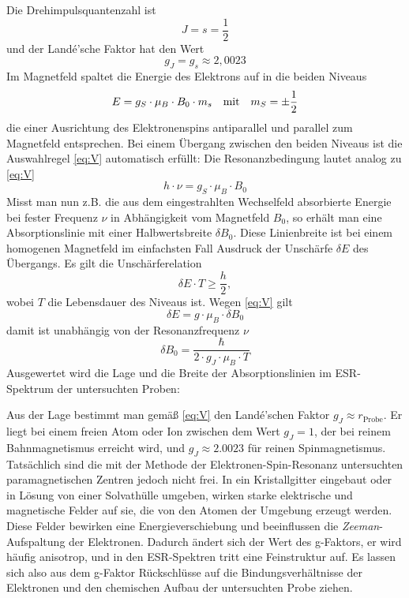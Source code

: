 \documentclass[ngerman]{scrartcl}
\begin{document}
Die Drehimpulsquantenzahl ist
\begin{equation*}
    J = s = \frac{1}{2}
\end{equation*}
und der Landé'sche Faktor hat den Wert
\begin{equation*}
    g_J = g_s \approx 2,0023
\end{equation*}
Im Magnetfeld spaltet die Energie des Elektrons auf in die beiden Niveaus
\begin{equation}
    E = g_S \cdot \mu_B \cdot B_0 \cdot m_s \qq{mit} m_S = \pm \frac{1}{2}
\end{equation}
die einer Ausrichtung des Elektronenspins antiparallel und parallel zum Magnetfeld entsprechen. Bei einem Übergang zwischen den beiden Niveaus ist die Auswahlregel \ref{eq:V} automatisch erfüllt: Die Resonanzbedingung lautet analog zu \ref{eq:V}
\begin{equation}
    h \cdot \nu = g_S \cdot \mu_B \cdot B_0
\end{equation}
Misst man nun z.B. die aus dem eingestrahlten Wechselfeld absorbierte Energie bei fester Frequenz $\nu$ in Abhängigkeit vom Magnetfeld $B_0$, so erhält man eine Absorptionslinie mit einer Halbwertsbreite $\delta B_0$. Diese Linienbreite ist bei einem homogenen Magnetfeld im einfachsten Fall Ausdruck der Unschärfe $\delta E$ des Übergangs. Es gilt die Unschärferelation
\begin{equation}
    \delta E \cdot T \geq \frac{h}{2},
\end{equation}
wobei $T$ die Lebensdauer des Niveaus ist. Wegen \autoref{eq:V} gilt
\begin{equation}
    \delta E = g \cdot \mu_B \cdot \delta B_0
\end{equation}
damit ist unabhängig von der Resonanzfrequenz $\nu$
\begin{equation}
    \delta B_0 = \frac{\hbar}{2 \cdot g_J \cdot \mu_B \cdot T}
\end{equation}
Ausgewertet wird die Lage und die Breite der Absorptionslinien im ESR-Spektrum der untersuchten Proben:

Aus der Lage bestimmt man gemäß \autoref{eq:V} den Landé'schen Faktor $g_J \approx r_{\text{Probe}}$. Er liegt bei einem freien Atom oder Ion zwischen dem Wert $g_J = 1$, der bei reinem Bahnmagnetismus erreicht wird, und $g_J \approx \num{2.0023}$ für reinen Spinmagnetismus. Tatsächlich sind die mit der Methode der Elektronen-Spin-Resonanz untersuchten paramagnetischen Zentren jedoch nicht frei. In ein Kristallgitter eingebaut oder in Lösung von einer Solvathülle umgeben, wirken starke elektrische und magnetische Felder auf sie, die von den Atomen der Umgebung erzeugt werden. Diese Felder bewirken eine Energieverschiebung und beeinflussen die \textit{Zeeman}-Aufspaltung der Elektronen. Dadurch ändert sich der Wert des g-Faktors, er wird häufig anisotrop, und in den ESR-Spektren tritt eine Feinstruktur auf. Es lassen sich also aus dem g-Faktor Rückschlüsse
auf die Bindungsverhältnisse der Elektronen und den chemischen Aufbau der untersuchten Probe ziehen.
\end{document}
